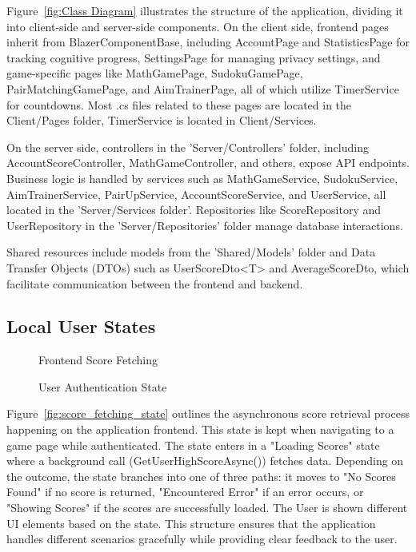 \documentclass[11pt,a4paper]{article}
\newcommand{\inputdiagram}[1]{}
\newcommand{\textwidthdiagram}[2][1]{%
  \resizebox{#1\textwidth}{!}{\inputdiagram{#2}}%
}
\begin{document}
Figure~\ref{fig:Class Diagram} illustrates the structure of the application, dividing it into client-side and server-side components. On the client side, frontend pages inherit from BlazerComponentBase, including AccountPage and StatisticsPage for tracking cognitive progress, SettingsPage for managing privacy settings, and game-specific pages like MathGamePage, SudokuGamePage, PairMatchingGamePage, and AimTrainerPage, all of which utilize TimerService for countdowns. Most .cs files related to these pages are located in the Client/Pages folder, TimerService is located in Client/Services.

On the server side, controllers in the 'Server/Controllers' folder, including AccountScoreController, MathGameController, and others, expose API endpoints. Business logic is handled by services such as MathGameService, SudokuService, AimTrainerService, PairUpService, AccountScoreService, and UserService, all located in the 'Server/Services folder'. Repositories like ScoreRepository and UserRepository in the 'Server/Repositories' folder manage database interactions.

Shared resources include models from the 'Shared/Models' folder and Data Transfer Objects (DTOs) such as UserScoreDto<T> and AverageScoreDto, which facilitate communication between the frontend and backend.

\subsection{Local User States}
\begin{figure}[H]
    \centering
    \begin{minipage}[b]{0.59\textwidth}
        \centering
        \textwidthdiagram{score_fetching_state.tex}
        \caption{Frontend Score Fetching}
        \label{fig:score_fetching_state}
    \end{minipage}
    \hfil
    \begin{minipage}[b]{0.4\textwidth}
        \centering
        \textwidthdiagram{user_authentication_state.tex}
        \caption{User Authentication State}
        \label{fig:user_authentication_state}
    \end{minipage}
\end{figure}

Figure~\ref{fig:score_fetching_state} outlines the asynchronous score
retrieval process happening on the application frontend. This state is kept
when navigating to a game page while authenticated. The state enters in a
"Loading Scores" state where a background call (GetUserHighScoreAsync())
fetches data. Depending on the outcome, the state branches into one
of three paths: it moves to "No Scores Found" if no score is returned,
"Encountered Error" if an error occurs, or "Showing Scores" if the scores
are successfully loaded. The User is shown different UI elements based on
the state. This structure ensures that the application handles different
scenarios gracefully while providing clear feedback to the user.
\end{document}
